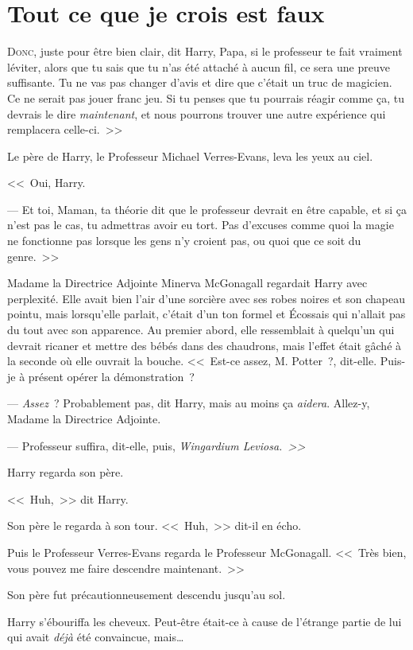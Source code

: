 \chapter{Tout ce que je crois est faux}

\lettrine[ante=<<~]{D}{onc}, juste pour être bien clair, dit Harry, Papa, si le professeur te fait vraiment léviter, alors que tu sais que tu n'as été attaché à aucun fil, ce sera une preuve suffisante. Tu ne vas pas changer d'avis et dire que c'était un truc de magicien. Ce ne serait pas jouer franc jeu. Si tu penses que tu pourrais réagir comme ça, tu devrais le dire \emph{maintenant}, et nous pourrons trouver une autre expérience qui remplacera celle-ci.~>>

Le père de Harry, le Professeur Michael Verres-Evans, leva les yeux au ciel.

<<~Oui, Harry.

--- Et toi, Maman, ta théorie dit que le professeur devrait en être capable, et si ça n'est pas le cas, tu admettras avoir eu tort. Pas d'excuses comme quoi la magie ne fonctionne pas lorsque les gens n'y croient pas, ou quoi que ce soit du genre.~>>

Madame la Directrice Adjointe Minerva McGonagall regardait Harry avec perplexité. Elle avait bien l'air d'une sorcière avec ses robes noires et son chapeau pointu, mais lorsqu'elle parlait, c'était d'un ton formel et Écossais qui n'allait pas du tout avec son apparence. Au premier abord, elle ressemblait à quelqu'un qui devrait ricaner et mettre des bébés dans des chaudrons, mais l'effet était gâché à la seconde où elle ouvrait la bouche. <<~Est-ce assez, M. Potter~?, dit-elle. Puis-je à présent opérer la démonstration~?

--- \emph{Assez}~? Probablement pas, dit Harry, mais au moins ça \emph{aidera}. Allez-y, Madame la Directrice Adjointe.

--- Professeur suffira, dit-elle, puis, \emph{Wingardium Leviosa.~>>}

Harry regarda son père.

<<~Huh,~>> dit Harry.

Son père le regarda à son tour. <<~Huh,~>> dit-il en écho.

Puis le Professeur Verres-Evans regarda le Professeur McGonagall. <<~Très bien, vous pouvez me faire descendre maintenant.~>>

Son père fut précautionneusement descendu jusqu'au sol.

Harry s'ébouriffa les cheveux. Peut-être était-ce à cause de l'étrange partie de lui qui avait \emph{déjà} été convaincue, mais\ldots{}

